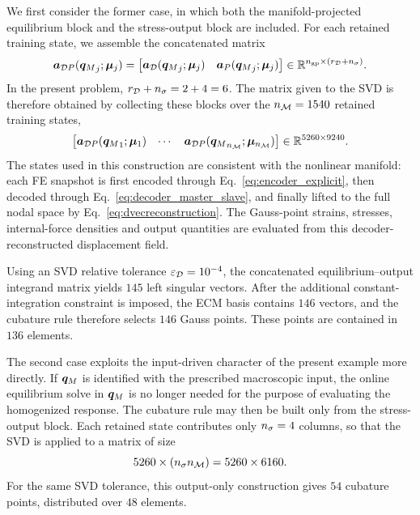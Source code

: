 \documentclass[11pt,a4paper]{article}
\begin{document}
We first consider the former case, in which both the manifold-projected
equilibrium block and the stress-output block are included. For each retained
training state, we assemble the concatenated matrix
\begin{equation}
\label{eq:aDP_single_state}
    \bm{a}_{\mathcal{D}P}({\bm{q}_M}_j;\bm{\mu}_j)
    =
    \begin{bmatrix}
    \bm{a}_{\mathcal{D}}({\bm{q}_M}_j;\bm{\mu}_j) &
    \bm{a}_{P}({\bm{q}_M}_j;\bm{\mu}_j)
    \end{bmatrix}
    \in
    \mathbb{R}^{n_{\mathrm{gp}}\times(r_{\mathcal{D}}+n_{\sigma})} .
\end{equation}
In the present problem, $r_{\mathcal{D}}+n_{\sigma}=2+4=6$. The matrix given to the SVD is
therefore obtained by collecting these blocks over the $n_{\mathcal{M}}=1540$ retained
training states,
\[
    \begin{bmatrix}
    \bm{a}_{\mathcal{D}P}({\bm{q}_M}_1;\bm{\mu}_1) &
    \cdots &
    \bm{a}_{\mathcal{D}P}({\bm{q}_M}_{n_{\mathcal{M}}};\bm{\mu}_{n_{\mathcal{M}}})
    \end{bmatrix}
    \in
    \mathbb{R}^{5260\times 9240}.
\]
The states used in this construction are consistent with the nonlinear
manifold: each FE snapshot is first encoded through
Eq.~\eqref{eq:encoder_explicit}, then decoded through
Eq.~\eqref{eq:decoder_master_slave}, and finally lifted to the full nodal
space by Eq.~\eqref{eq:dvecreconstruction}. The Gauss-point strains, stresses,
internal-force densities and output quantities are evaluated from this
decoder-reconstructed displacement field.

Using an SVD relative tolerance   $\varepsilon_{\mathcal{D}} = 10^{-4}$, the concatenated equilibrium--output
integrand matrix yields $145$ left singular vectors. After the additional
constant-integration constraint is imposed, the ECM basis contains $146$
vectors, and the cubature rule therefore selects $146$ Gauss points. These
points are contained in $136$ elements.

The second case exploits the input-driven character of the present example more
directly. If $\bm{q}_M$ is identified with the prescribed macroscopic input, the
online equilibrium solve in $\bm{q}_M$ is no longer needed for the purpose of
evaluating the homogenized response. The cubature rule may then be built only
from the stress-output block. Each retained state contributes only
$n_{\sigma}=4$ columns, so that the SVD is applied to a matrix of size
\[
    5260\times(n_{\sigma}n_{\mathcal{M}})
    =
    5260\times 6160 .
\]
For the same SVD tolerance, this output-only construction gives $54$ cubature
points, distributed over $48$ elements.
\end{document}
